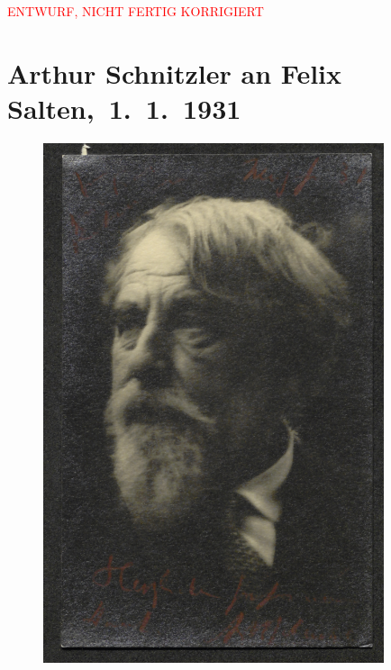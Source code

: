
\begin{center}
            \textcolor{red}{ENTWURF, NICHT FERTIG KORRIGIERT}
                      \end{center}
            
         
         \renewcommand{\erwaehntePersonen}{Personen: Felix Salten}
         \renewcommand{\erwaehnteOrte}{Orte: Wien}
         \renewcommand{\erwaehnteWerke}{Werke: Arthur Schnitzler}
               \section[ Arthur Schnitzler an Felix Salten, 1. 1. 1931]{ Arthur Schnitzler an Felix Salten, 1. 1. 1931}\nopagebreak{}\rehead{ }\begin{ledgroupsized}[t]{13cm}\normalsize\beginnumbering \toendnotes[C]{\smallbreak\pagebreak[2]} 
\toendnotes[C]{\smallbreak}\begin{figure}[H]\centering\includegraphics[width=10cm]{../tex-inputs/img/ZPH1681_Box_17_3_11_11_40_4_0001_1.jpg}\end{figure}\pstart

\end{ledgroupsized}
